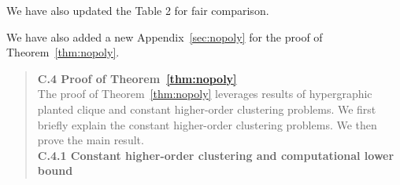 \documentclass[11pt]{article}
\theoremstyle{plain}
\theoremstyle{definition}
\begin{document}
\begin{enumerate}[wide, labelwidth=!, labelindent=0pt]
We have also updated the Table 2 for fair comparison. 
 \begin{table}[h]
    \centering
    \caption{Comparison of our results with previous work. \color{blue}For simplicity, we omit the log term in the rate. $^{*}$The optimality is achieved under extra Lipchitz monotonicity conditions. }
 \label{tab:comp}
\end{table}


We have also added a new Appendix~\ref{sec:nopoly} for the proof of Theorem~\ref{thm:nopoly}. 
\begin{quote}
\color{blue}

{\bf C.4 Proof of Theorem~\ref{thm:nopoly}}\\

The proof of Theorem~\ref{thm:nopoly} leverages results of hypergraphic planted clique and constant higher-order clustering problems. We first briefly explain the constant higher-order clustering problems. We then prove the main result.\\

{\bf C.4.1 Constant higher-order clustering and computational lower bound} \\


\end{quote}
\end{enumerate}
\end{document}
